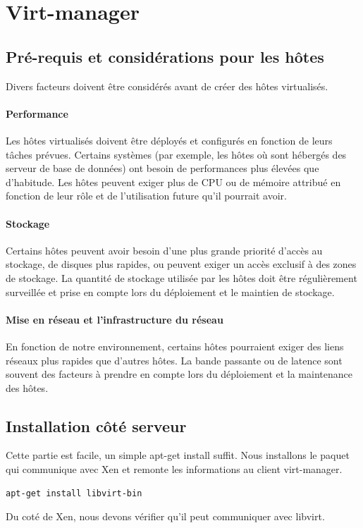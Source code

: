 \chapter{Virt-manager}
\section{Pré-requis et considérations pour les hôtes}
Divers facteurs doivent être considérés avant de créer des hôtes virtualisés.
\subsubsection{Performance} 
Les hôtes virtualisés doivent être déployés et configurés en fonction de leurs tâches prévues. Certains systèmes (par exemple, les hôtes où sont hébergés des serveur de base de données) ont besoin de performances plus élevées que d'habitude. Les hôtes peuvent exiger plus de CPU ou de mémoire attribué en fonction de leur rôle et de l'utilisation future qu'il pourrait avoir.
\subsubsection{Stockage}
Certains hôtes peuvent avoir besoin d'une plus grande priorité d'accès au stockage, de disques plus rapides, ou peuvent exiger un accès exclusif à des zones de stockage. La quantité de stockage utilisée par les hôtes doit être régulièrement surveillée et prise en compte lors du déploiement et le maintien de stockage.
\subsubsection{Mise en réseau et l'infrastructure du réseau}
 En fonction de notre environnement, certains hôtes pourraient exiger des liens réseaux plus rapides que d'autres hôtes. La bande passante ou de latence sont souvent des facteurs à prendre en compte lors du déploiement et la maintenance des hôtes.
\section{Installation côté serveur}
Cette partie est facile, un simple apt-get install suffit. Nous installons le paquet qui communique avec Xen et remonte les informations au client virt-manager.
\begin{lstlisting}
apt-get install libvirt-bin
\end{lstlisting} 
Du coté de Xen, nous devons vérifier qu’il peut communiquer avec libvirt.

